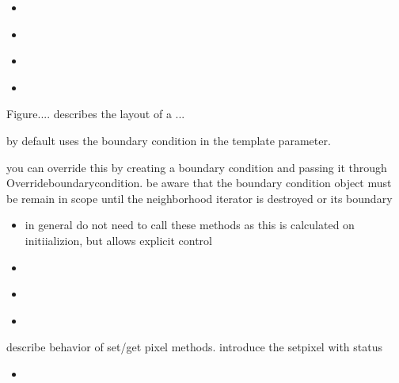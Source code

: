 {\begin{itemize}
\item \textbf{} 

\item \textbf{} 
\item \textbf{}
\item \textbf{}

\end{itemize}


Figure.... describes the layout of a ...


% 


by default uses the boundary condition in the template parameter.

you can override this by creating a boundary condition and passing it through
Overrideboundarycondition.  be aware that the boundary condition object must be
remain in scope until the neighborhood iterator is destroyed or its boundary
 

\begin{itemize}
\item \textbf{} in general do not
need to call these methods as this is calculated on initiializion, but allows
explicit control
\item \textbf{} 
\item \textbf{} 
\item \textbf{} 
\end{itemize}

describe behavior of set/get pixel methods.  introduce the setpixel with status
\begin{itemize}
\item \textbf{} 
\end{itemize}

}
